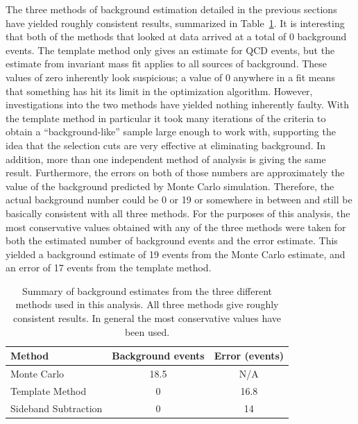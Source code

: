 The three methods of background estimation 
detailed in the previous sections have yielded 
roughly consistent results, 
summarized in Table~\ref{TableBGSub}.  
It is interesting that both of the methods 
that looked at data arrived at a total 
of 0 background events.  
The template method only gives an estimate for 
QCD events, 
but the estimate from invariant mass fit 
applies to all sources of background.  
These values of zero inherently look suspicious; 
a value of 0 anywhere in a fit 
means that something 
has hit its limit in the optimization 
algorithm.  
However, investigations into the two methods 
have yielded nothing inherently faulty.  
With the template method in particular 
it took many iterations of the criteria 
to obtain a ``background-like'' sample 
large enough to work with, 
supporting the idea that the selection 
cuts are very effective at eliminating background.  
In addition, more than one independent 
method of analysis is giving the same result.  
Furthermore, the errors on both of those numbers 
are approximately the value of the background 
predicted by Monte Carlo simulation.  
Therefore, the actual background number 
could be 0 or 19 or somewhere in between 
and still be basically consistent with 
all three methods.  
For the purposes of this analysis, 
the most conservative values obtained 
with any of the three methods were 
taken for both the estimated number 
of background events and the error estimate.  
This yielded a background estimate of 
19 events from the Monte Carlo estimate, 
and an error of 17 events from the template method.  

\begin{table}[htbp]
  \begin{center}
    \caption[\fixspacing Summary of background estimates from different methods]{
      \fixspacing Summary of background estimates from the three 
      different methods used in this analysis.  
      All three methods give roughly consistent results.  
      In general the most conservative values have been used.  
    }
    \label{TableBGSub}
    \begin{tabular}[]{ | l | c | c | }
      \hline
      Method & Background events & Error (events)  \\ \hline \hline
      Monte Carlo & 18.5 & N/A \\ \hline 
      Template Method & 0 & 16.8 \\ \hline 
      Sideband Subtraction & 0 & 14 \\ \hline 
    \end{tabular}
  \end{center}
\end{table}


